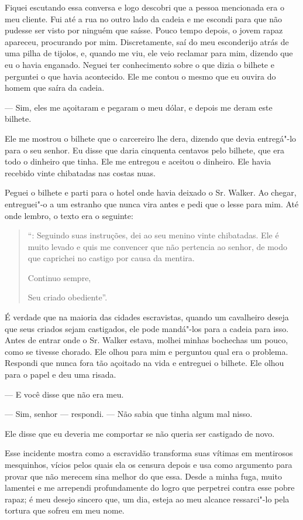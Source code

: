 Fiquei escutando essa conversa e logo descobri que a pessoa mencionada
era o meu cliente. Fui até a rua no outro lado da cadeia e me escondi
para que não pudesse ser visto por ninguém que saísse. Pouco tempo
depois, o jovem rapaz apareceu, procurando por mim. Discretamente, saí
do meu esconderijo atrás de uma pilha de tijolos, e, quando me viu, ele
veio reclamar para mim, dizendo que eu o havia enganado. Neguei ter
conhecimento sobre o que dizia o bilhete e perguntei o que havia
acontecido. Ele me contou o mesmo que eu ouvira do homem que saíra da
cadeia.

--- Sim, eles me açoitaram e pegaram o meu dólar, e depois me deram este
bilhete.

Ele me mostrou o bilhete que o carcereiro lhe dera, dizendo que devia
entregá"-lo para o seu senhor. Eu disse que daria cinquenta centavos pelo
bilhete, que era todo o dinheiro que tinha. Ele me entregou e aceitou o
dinheiro. Ele havia recebido vinte chibatadas nas costas nuas.

Peguei o bilhete e parti para o hotel onde havia deixado o Sr. Walker.
Ao chegar, entreguei"-o a um estranho que nunca vira antes e pedi que o
lesse para mim. Até onde lembro, o texto era o seguinte:

\begin{quote}
``: Seguindo suas instruções, dei ao seu menino vinte
chibatadas. Ele é muito levado e quis me convencer que não pertencia ao
senhor, de modo que caprichei no castigo por causa da mentira.

Continuo sempre,

Seu criado obediente''.
\end{quote}

É verdade que na maioria das cidades escravistas, quando um cavalheiro
deseja que seus criados sejam castigados, ele pode mandá"-los para a
cadeia para isso. Antes de entrar onde o Sr. Walker estava, molhei
minhas bochechas um pouco, como se tivesse chorado. Ele olhou para mim e
perguntou qual era o problema. Respondi que nunca fora tão açoitado na
vida e entreguei o bilhete. Ele olhou para o papel e deu uma risada.

--- E você disse que não era meu.

--- Sim, senhor --- respondi. --- Não sabia que tinha algum mal nisso.

Ele disse que eu deveria me comportar se não queria ser castigado de
novo.

Esse incidente mostra como a escravidão transforma suas vítimas em
mentirosos mesquinhos, vícios pelos quais ela os censura depois e usa
como argumento para provar que não merecem sina melhor do que essa.
Desde a minha fuga, muito lamentei e me arrependi profundamente do logro
que perpetrei contra esse pobre rapaz; é meu desejo sincero que, um dia,
esteja ao meu alcance ressarci"-lo pela tortura que sofreu em meu nome.

